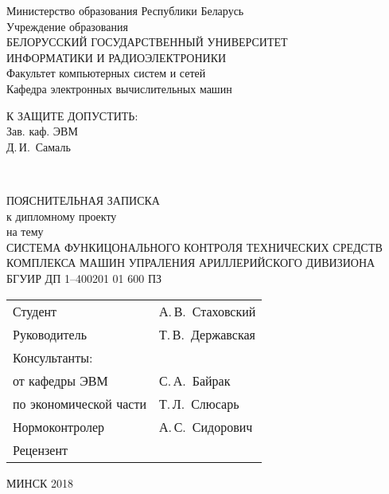 \begin{titlepage}
  \begin{center}
    Министерство образования Республики Беларусь \\[1em]
    Учреждение образования \\
    БЕЛОРУССКИЙ ГОСУДАРСТВЕННЫЙ УНИВЕРСИТЕТ \\
    ИНФОРМАТИКИ И РАДИОЭЛЕКТРОНИКИ \\[1em]

    Факультет компьютерных систем и сетей \\ [1em]
    Кафедра электронных вычислительных машин \\[2em]

    \begin{flushright}
      \begin{minipage}{0.4\textwidth}
        К ЗАЩИТЕ ДОПУСТИТЬ: \\
        Зав. каф. ЭВМ \\
        \underline{\hspace*{2.8cm}} Д.\,И.~Самаль
      \end{minipage}\\[2.2em]
    \end{flushright}

    {ПОЯСНИТЕЛЬНАЯ ЗАПИСКА}\\
    {к дипломному проекту}\\
    {на тему}\\
    {СИСТЕМА ФУНКИЦОНАЛЬНОГО КОНТРОЛЯ ТЕХНИЧЕСКИХ СРЕДСТВ КОМПЛЕКСА МАШИН УПРАЛЕНИЯ АРИЛЛЕРИЙСКОГО ДИВИЗИОНА}\\[2em]


    {БГУИР ДП 1--400201 01 600 ПЗ}\\[2em]

    \begin{tabular}{ p{}p{} }
      Студент & А.\,В.~Стаховский\\[1em]
      Руководитель & Т.\,В.~Державская \\[1em]
      Консультанты: &\\[1em]
      \hspace*{3ex}от кафедры ЭВМ & С.\,А.~Байрак \\[1em]
      \hspace*{3ex}по экономической части & Т.\,Л.~Слюсарь \\[1em]
      Нормоконтролер & А.\,С.~Сидорович\\[1em]
      Рецензент &
    \end{tabular}

    \vfill
    {\normalsize МИНСК 2018}
  \end{center}
\end{titlepage}
